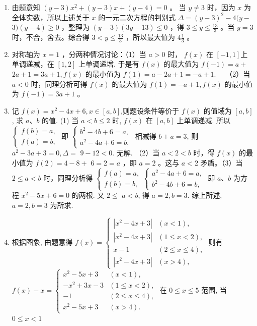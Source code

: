 \documentclass[10pt]{article}
\begin{document}
\begin{enumerate}
  \item 由题意知 $(y-3) x^{2}+(y-3) x+(y-4)=0$ 。 当 $y \neq 3$ 时，因为 $x$ 为全体实数，所以上述关于 $x$ 的一元二次方程的判别式 $\Delta=(y-3)^{2}-4(y-$ $3)(y-4) \geqslant 0$ ，整理为 $(y-3)(3 y-13) \leqslant 0$ ，得 $3 \leqslant y \leqslant \frac{13}{3}$ 。当 $y=3$ 时，不合，舍去。综合得 $3<y \leqslant \frac{13}{3}$ ，所以最大值为 $4 \frac{1}{3}$ 。
  \item 对称轴为 $x=1$ ，分两种情况讨论：（1）当 $a>0$ 时， $f(x)$ 在 $[-1,1]$上单调递减，在 $[1,2]$ 上单调递增. 于是有 $f(x)$ 的最大值为 $f(-1)=a+$ $2 a+1=3 a+1, f(x)$ 的最小值为 $f(1)=a-2 a+1=-a+1 . \quad$ （2）当 $a<0$ 时，同理分析可得 $f(x)$ 的最大值为 $f(1)=-a+1, f(x)$ 的最小值为 $f(-1)=3 a+1$ 。
  \item 记 $f(x)=x^{2}-4 x+6, x \in[a, b]$,则题设条件等价于 $f(x)$ 的值域为 $[a, b]$, 求 $a 、 b$ 的值. (1) 当 $a<b \leqslant 2$ 时, $f(x)$ 在 $[a, b]$ 上单调递减. 所以 $\left\{\begin{array}{l}f(b)=a, \\ f(a)=b,\end{array}\right.$ 即 $\left\{\begin{array}{l}b^{2}-4 b+6=a, \\ a^{2}-4 a+6=b,\end{array}\right.$ 相减得 $b+a=3$, 则 $a^{2}-3 a+3=0, \Delta=$ $9-12<0$. 无解. （2）当 $a<2<b$ 时，得 $f(x)$ 的最小值为 $f(2)=4-8+$ $6=2=a$ ，即 $a=2$ 。这与 $a<2$ 矛盾。（3）当 $2 \leqslant a<b$ 时，同理分析得 $\left\{\begin{array}{l}f(a)=a, \\ f(b)=b,\end{array}\left\{\begin{array}{l}a^{2}-4 a+6=a, \\ b^{2}-4 b+6=b,\end{array}\right.\right.$ 即 $a 、 b$ 为方程 $x^{2}-5 x+6=0$ 的两根. 又 $2 \leqslant$ $a<b$, 得 $a=2, b=3$. 综上所述, $a=2, b=3$ 为所求.
  \item 根据图象, 由题意得 $f(x)=\left\{\begin{array}{ll}\left|x^{2}-4 x+3\right| & (x<1), \\ \left|x^{2}-4 x+3\right| & (1 \leqslant x<2), \\ x-1 & (2 \leqslant x \leqslant 4), \\ \left|x^{2}-4 x+3\right| & (x>4),\end{array}\right.$ 则有\\
$f(x)-x=\left\{\begin{array}{ll}x^{2}-5 x+3 & (x<1), \\ -x^{2}+3 x-3 & (1 \leqslant x<2), \\ -1 & (2 \leqslant x \leqslant 4), \\ x^{2}-5 x+3 & (x>4) .\end{array}\right.$ 在 $0 \leqslant x \leqslant 5$ 范围, 当 $0 \leqslant x<1$\\

\end{enumerate}
\end{document}

